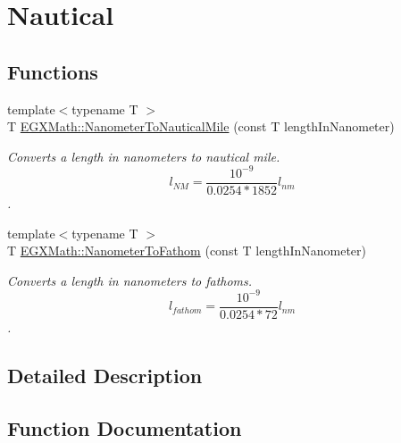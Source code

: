 \hypertarget{group___e_g_x_math-_conversions-_length_conversions-_nanometer-_nautical}{}\section{Nautical}
\label{group___e_g_x_math-_conversions-_length_conversions-_nanometer-_nautical}
\subsection*{Functions}
\begin{DoxyCompactItemize}
\item 
{\footnotesize template$<$typename T $>$ }\\T \mbox{\hyperlink{group___e_g_x_math-_conversions-_length_conversions-_nanometer-_nautical_gac428c495bff87ba53c856395a7410fc3}{E\+G\+X\+Math\+::\+Nanometer\+To\+Nautical\+Mile}} (const T length\+In\+Nanometer)
\begin{DoxyCompactList}\small\item\em Converts a length in nanometers to nautical mile. \[ l_{NM}= \frac{10^{-9}}{0.0254 * 1852} l_{nm} \]. \end{DoxyCompactList}\item 
{\footnotesize template$<$typename T $>$ }\\T \mbox{\hyperlink{group___e_g_x_math-_conversions-_length_conversions-_nanometer-_nautical_ga934c7c5c17c283b51e1551b9731f05b6}{E\+G\+X\+Math\+::\+Nanometer\+To\+Fathom}} (const T length\+In\+Nanometer)
\begin{DoxyCompactList}\small\item\em Converts a length in nanometers to fathoms. \[ l_{fathom}= \frac{10^{-9}}{0.0254 * 72} l_{nm} \]. \end{DoxyCompactList}\end{DoxyCompactItemize}


\subsection{Detailed Description}


\subsection{Function Documentation}
\mbox{\label{group___e_g_x_math-_conversions-_length_conversions-_nanometer-_nautical_ga934c7c5c17c283b51e1551b9731f05b6}} 
